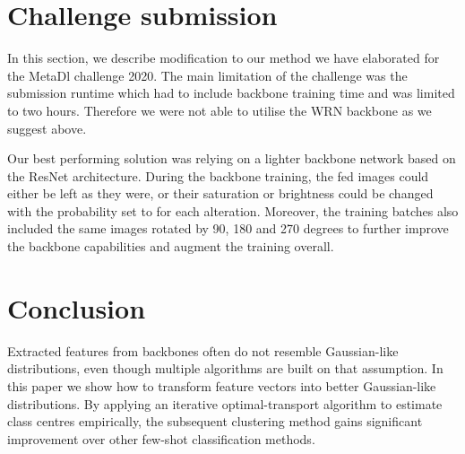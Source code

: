 \documentclass[letterpaper]{article} \usepackage{aaai20}  \usepackage{times}  \usepackage{helvet} \usepackage{courier}  \usepackage[hyphens]{url}  \usepackage{graphicx} \urlstyle{rm} \def\UrlFont{\rm}  \usepackage{graphicx}  \frenchspacing  \setlength{\pdfpagewidth}{8.5in}  \setlength{\pdfpageheight}{11in}  \usepackage[ruled,vlined]{algorithm2e}
\begin{document}
\begin{table}[]
\caption{-values of the paired t-test with the null hypothesis that the accuracy of the PT+MAP model is greater or equal than the accuracy of the LST+MAP model against the alternative that the accuracy of the PT+MAP model is smaller than the accuracy of the LST+MAP model.}
\vspace{5mm}
\label{tab:ttest}
\centering
{}
\end{table}

\section{Challenge submission}
In this section, we describe modification to our method we have elaborated for the MetaDl challenge 2020. The main limitation of the challenge was the submission runtime which had to include backbone training time and was limited to two hours. Therefore we were not able to utilise the WRN backbone as we suggest above.

Our best performing solution was relying on a lighter backbone network based on the ResNet architecture. During the backbone training, the fed images could either be left as they were, or their saturation or brightness could be changed with the probability set to  for each alteration. Moreover, the training batches also included the same images rotated by 90, 180 and 270 degrees to further improve the backbone capabilities and augment the training overall. 

\section{Conclusion}
Extracted features from backbones often do not resemble Gaussian-like distributions, even though multiple algorithms are built on that assumption. In this paper we show how to transform feature vectors into better Gaussian-like distributions. By applying an iterative optimal-transport algorithm to estimate class centres empirically, the subsequent clustering method gains significant improvement over other few-shot classification methods. 
\end{document}
